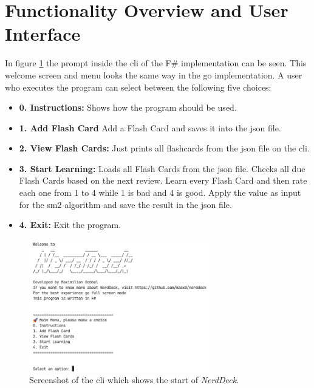     \section{Functionality Overview and User Interface}
    In figure \ref{fig:screenshotcli} the prompt inside the \ac{cli} of the F\# implementation can be seen. This welcome screen and menu looks the same way in the go implementation. A user who executes the program can select between the following five choices:        
    \begin{itemize}
        \item \textbf{0. Instructions:} Shows how the program should be used.
        \item \textbf{1. Add Flash Card} Add a Flash Card and saves it into the \ac{json} file.
        \item \textbf{2. View Flash Cards:} Just prints all flashcards from the \ac{json} file on the \ac{cli}.
        \item \textbf{3. Start Learning:} Loads all Flash Cards from the \ac{json} file. Checks all due Flash Cards based on the next review. Learn every Flash Card and then rate each one from 1 to 4 while 1 is bad and 4 is good. Apply the value as input for the \ac{sm2} algorithm and save the result in the \ac{json} file.
        \item \textbf{4. Exit:} Exit the program.
    \end{itemize}

    \begin{figure}
        \centering
        \includegraphics[width=0.7\textwidth]{ScreenshotNerdDeck.png}
        \caption{Screenshot of the \ac{cli} which shows the start of \textit{NerdDeck}.}
        \label{fig:screenshotcli}
    \end{figure}


